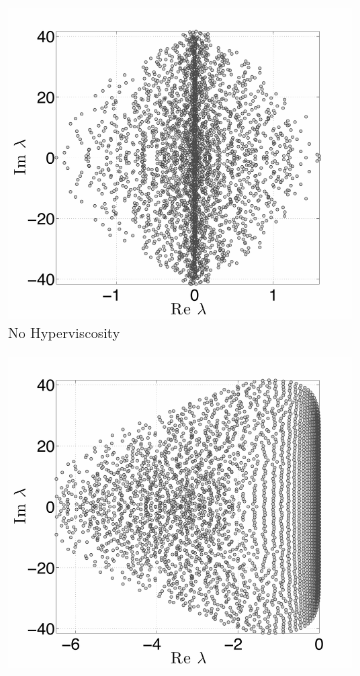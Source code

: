 \begin{figure}[ht!]
\begin{center}
\begin{subfigure}[b]{0.45\textwidth}
	\centering
	\includegraphics[width=1.0\textwidth]{figures/paper1/figures/cosine_bell/eigs_N4096_n101_noHV_SCALED.pdf}
	\caption{No Hyperviscosity}
	\label{fig:cosine_eigs_nohv}
\end{subfigure}
\begin{subfigure}[b]{0.45\textwidth}
	\includegraphics[width=1.0\textwidth]{figures/paper1/figures/cosine_bell/eigs_HV_N4096_n101_k8_gamma5e_m2_SCALED.pdf}

\end{subfigure}
\end{center}
\end{figure}
